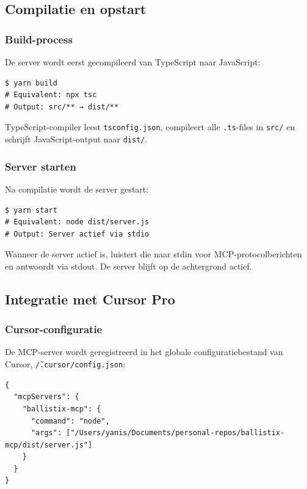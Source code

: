 \subsection{Compilatie en opstart}

\subsubsection{Build-process}

De server wordt eerst gecompileerd van TypeScript naar JavaScript:

\begin{verbatim}
$ yarn build
# Equivalent: npx tsc
# Output: src/** → dist/**
\end{verbatim}

TypeScript-compiler leest \texttt{tsconfig.json}, compileert alle \texttt{.ts}-files in \texttt{src/} en schrijft JavaScript-output naar \texttt{dist/}.

\subsubsection{Server starten}

Na compilatie wordt de server gestart:

\begin{verbatim}
$ yarn start
# Equivalent: node dist/server.js
# Output: Server actief via stdio
\end{verbatim}

Wanneer de server actief is, luistert die naar stdin voor MCP-protocolberichten en antwoordt via stdout. De server blijft op de achtergrond actief.

\subsection{Integratie met Cursor Pro}

\subsubsection{Cursor-configuratie}

De MCP-server wordt geregistreerd in het globale configuratiebestand van Cursor, \texttt{\~/.cursor/config.json}:

\begin{verbatim}
{
  "mcpServers": {
    "ballistix-mcp": {
      "command": "node",
      "args": ["/Users/yanis/Documents/personal-repos/ballistix-mcp/dist/server.js"]
    }
  }
}
\end{verbatim}

